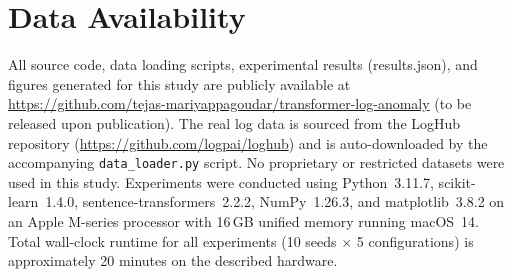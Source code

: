 \documentclass[conference]{IEEEtran}
\begin{document}
\section*{Data Availability}

All source code, data loading scripts, experimental results (results.json),
and figures generated for this study are publicly available at
\url{https://github.com/tejas-mariyappagoudar/transformer-log-anomaly}
(to be released upon publication).  The real log data is sourced from the
LogHub repository (\url{https://github.com/logpai/loghub}) and is
auto-downloaded by the accompanying \texttt{data\_loader.py} script.  No
proprietary or restricted datasets were used in this study.  Experiments were conducted using Python~3.11.7,
scikit-learn~1.4.0, sentence-transformers~2.2.2, NumPy~1.26.3, and
matplotlib~3.8.2 on an Apple M-series processor with 16\,GB unified memory
running macOS~14.  Total wall-clock runtime for all experiments (10 seeds
$\times$ 5 configurations) is approximately 20 minutes on the described
hardware.



\end{document}
